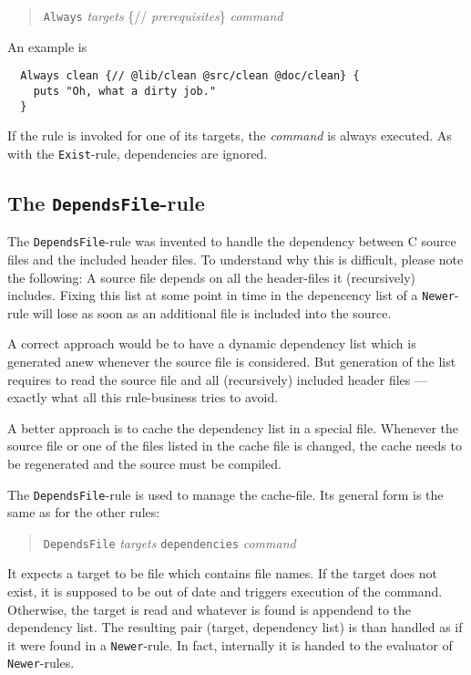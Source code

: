 \documentclass[12pt]{article}
\begin{document}
\begin{quote}
  \texttt{Always} \textit{targets} \{// \textit{prerequisites}\} \textit{command}
\end{quote}

An example is
\begin{verbatim}
  Always clean {// @lib/clean @src/clean @doc/clean} {
    puts "Oh, what a dirty job."
  }
\end{verbatim}

If the rule is invoked for one of its targets, the \textit{command} is
always executed. As with the \texttt{Exist}-rule,
dependencies are ignored.

\subsection{The \texttt{DependsFile}-rule}
\label{sec:DependsFile}

The \texttt{DependsFile}-rule was invented to handle the dependency
between C source files and the included header files. To understand
why this is difficult, please note the following: A source file
depends on all the header-files it (recursively) includes. Fixing this
list at some point in time in the depencency list of a
\texttt{Newer}-rule will lose as soon as an additional file is
included into the source. 

A correct approach would be to have a dynamic dependency list which is
generated anew whenever the source file is considered. But generation
of the list requires to read the source file and all (recursively)
included header files --- exactly what all this rule-business tries to
avoid.

A better approach is to cache the dependency list in a special
file. Whenever the source file or one of the files listed in the
cache file is changed, the cache needs to be regenerated and the
source must be compiled.

The \texttt{DependsFile}-rule is used to manage the cache-file. Its
general form is the same as for the other rules:
\begin{quote}
  \texttt{DependsFile} \textit{targets} \texttt{dependencies}
 \textit{command}
\end{quote}

It expects a target to be file which contains file names. If the
target does not exist, it is supposed to be out of date and triggers
execution of the command. Otherwise, the target is read and whatever
is found is appendend to the dependency list. The resulting pair 
(target, dependency list) is than handled as if it were found in a
\texttt{Newer}-rule. In fact, internally it is handed to the
evaluator of \texttt{Newer}-rules.
\end{document}
